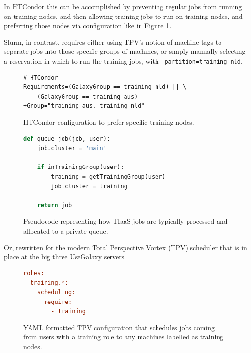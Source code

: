 \documentclass[a4paper,num-refs]{oup-contemporary}
\begin{document}
In HTCondor this can be accomplished by preventing regular jobs from running on training nodes, and then allowing training jobs to run on training nodes, and preferring those nodes via configuration like in Figure \ref{code:condorprefer}.

Slurm, in contrast, requires either using TPV's notion of machine tags to separate jobs into those specific groups of machines, or simply manually selecting a reservation in which to run the training jobs, with \texttt{--partition=training-nld}.

\begin{figure}[!ht]
\centering
\begin{lstlisting}[frame=single]  % Start your code-block
# HTCondor
Requirements=(GalaxyGroup == training-nld) || \
    (GalaxyGroup == training-aus)
+Group="training-aus, training-nld"
\end{lstlisting}
\caption{HTCondor configuration to prefer specific training nodes.\label{code:condorprefer}}
\end{figure}



\begin{figure}[!ht]
\centering
\begin{lstlisting}[frame=single,language=Python]  % Start your code-block
def queue_job(job, user):
    job.cluster = 'main'

    if inTrainingGroup(user):
        training = getTrainingGroup(user)
        job.cluster = training

    return job
\end{lstlisting}
\caption{Pseudocode representing how TIaaS jobs are typically processed and allocated to a private queue.\label{code:scheduler}}
\end{figure}

Or, rewritten for the modern Total Perspective Vortex (TPV) scheduler that is in place at the big three UseGalaxy servers:

\begin{figure}[!ht]
\centering
\begin{lstlisting}[frame=single,language=ini]  % Start your code-block
roles:
  training.*:
    scheduling:
      require:
        - training
\end{lstlisting}
\caption{YAML formatted TPV configuration that schedules jobs coming from users with a training role to any machines labelled as training nodes.\label{code:tpv}}
\end{figure}
\end{document}
